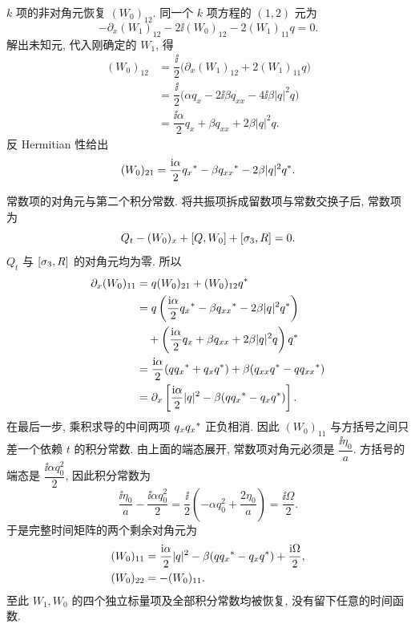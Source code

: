 \par\smallskip\noindent $k$ 项的非对角元恢复 $(W_0)_{12}$.\quad
同一个 $k$ 项方程的 $(1,2)$ 元为
\begin{equation*}
-\partial_x(W_1)_{12}-2\ii(W_0)_{12}
-2(W_1)_{11}q=0.
\end{equation*}
解出未知元, 代入刚确定的 $W_1$, 得
\begin{equation*}
\begin{aligned}
(W_0)_{12}
&=\dfrac{\ii}{2}
\bigl(\partial_x(W_1)_{12}+2(W_1)_{11}q\bigr)\\
&=\dfrac{\ii}{2}
\bigl(\alpha q_x-2\ii\beta q_{xx}
-4\ii\beta|q|^2q\bigr)\\
&=\dfrac{\ii\alpha}{2}q_x+\beta q_{xx}+2\beta|q|^2q.
\end{aligned}
\end{equation*}
反 Hermitian 性给出
\begin{equation*}
(W_0)_{21}
=\dfrac{\mathrm{i}\alpha}{2}{q_x}^{*}
-\beta{q_{xx}}^{*}-2\beta|q|^2{q}^{*}.
\end{equation*}

\par\smallskip\noindent 常数项的对角元与第二个积分常数.\quad
将共振项拆成留数项与常数交换子后,
常数项为
\begin{equation*}
Q_t-(W_0)_x+[Q,W_0]+[\sigma_3,R]=0.
\end{equation*}
$Q_t$ 与 $[\sigma_3,R]$ 的对角元均为零.
所以
\begin{equation*}
\begin{aligned}
\partial_x(W_0)_{11}
&=q(W_0)_{21}+(W_0)_{12}{q}^{*}\\
&=q\left(\dfrac{\mathrm{i}\alpha}{2}{q_x}^{*}
-\beta{q_{xx}}^{*}-2\beta|q|^2{q}^{*}\right)\\
&\quad+\left(\dfrac{\mathrm{i}\alpha}{2}q_x
+\beta q_{xx}+2\beta|q|^2q\right){q}^{*}\\
&=\dfrac{\mathrm{i}\alpha}{2}(q{q_x}^{*}+q_x{q}^{*})
+\beta(q_{xx}{q}^{*}-q{q_{xx}}^{*})\\
&=\partial_x\left[
\dfrac{\mathrm{i}\alpha}{2}|q|^2
-\beta(q{q_x}^{*}-q_x{q}^{*})
\right].
\end{aligned}
\end{equation*}
在最后一步, 乘积求导的中间两项
$q_x{q_x}^{*}$ 正负相消.
因此 $(W_0)_{11}$ 与方括号之间只差一个依赖 $t$ 的积分常数.
由上面的端态展开, 常数项对角元必须是
$\dfrac{\ii\eta_0}{a}$.
方括号的端态是 $\dfrac{\ii\alpha q_0^2}{2}$,
因此积分常数为
\begin{equation*}
\dfrac{\ii\eta_0}{a}-\dfrac{\ii\alpha q_0^2}{2}
=\dfrac{\ii}{2}\left(-\alpha q_0^2+\dfrac{2\eta_0}{a}\right)
=\dfrac{\ii\Omega}{2}.
\end{equation*}
于是完整时间矩阵的两个剩余对角元为
\begin{equation*}
\begin{aligned}
(W_0)_{11}
&=\dfrac{\mathrm{i}\alpha}{2}|q|^2
-\beta(q{q_x}^{*}-q_x{q}^{*})+\dfrac{\mathrm{i}\Omega}{2},\\
(W_0)_{22}&=-(W_0)_{11}.
\end{aligned}
\end{equation*}
至此 $W_1,W_0$ 的四个独立标量项及全部积分常数均被恢复,
没有留下任意的时间函数.

